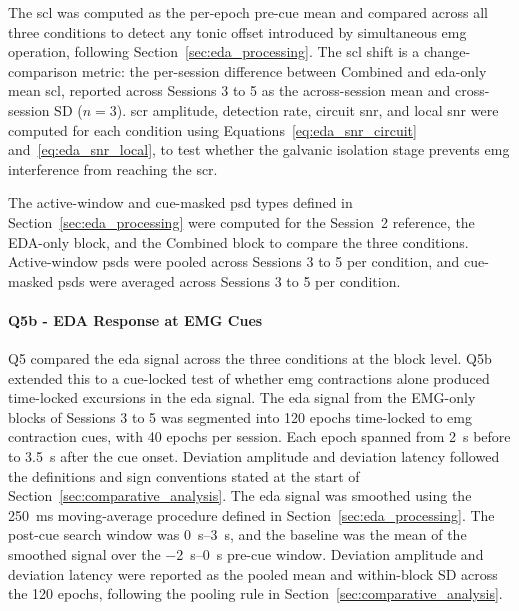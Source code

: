 The \gls{scl} was computed as the per-epoch pre-cue mean and compared across all three conditions to detect any tonic offset introduced by simultaneous \gls{emg} operation, following Section~\ref{sec:eda_processing}. The \gls{scl} shift is a change-comparison metric: the per-session difference between Combined and \gls{eda}-only mean \gls{scl}, reported across Sessions 3 to 5 as the across-session mean and cross-session SD ($n = 3$). \gls{scr} amplitude, detection rate, circuit \gls{snr}, and local \gls{snr} were computed for each condition using Equations~\ref{eq:eda_snr_circuit} and~\ref{eq:eda_snr_local}, to test whether the galvanic isolation stage prevents \gls{emg} interference from reaching the \gls{scr}.

The active-window and cue-masked \gls{psd} types defined in Section~\ref{sec:eda_processing} were computed for the Session~2 reference, the EDA-only block, and the Combined block to compare the three conditions. Active-window \gls{psd}s were pooled across Sessions 3 to 5 per condition, and cue-masked \gls{psd}s were averaged across Sessions 3 to 5 per condition.

\paragraph{Q5b - EDA Response at EMG Cues}
\label{sec:q5b_eda_at_emg_cues}
Q5 compared the \gls{eda} signal across the three conditions at the block level. Q5b extended this to a cue-locked test of whether \gls{emg} contractions alone produced time-locked excursions in the \gls{eda} signal. The \gls{eda} signal from the EMG-only blocks of Sessions 3 to 5 was segmented into 120 epochs time-locked to \gls{emg} contraction cues, with 40 epochs per session. Each epoch spanned from \SI{2}{\second} before to \SI{3.5}{\second} after the cue onset. Deviation amplitude and deviation latency followed the definitions and sign conventions stated at the start of Section~\ref{sec:comparative_analysis}. The \gls{eda} signal was smoothed using the \SI{250}{\milli\second} moving-average procedure defined in Section~\ref{sec:eda_processing}. The post-cue search window was \SIrange{0}{3}{\second}, and the baseline was the mean of the smoothed signal over the \SIrange{-2}{0}{\second} pre-cue window. Deviation amplitude and deviation latency were reported as the pooled mean and within-block SD across the 120 epochs, following the pooling rule in Section~\ref{sec:comparative_analysis}.

